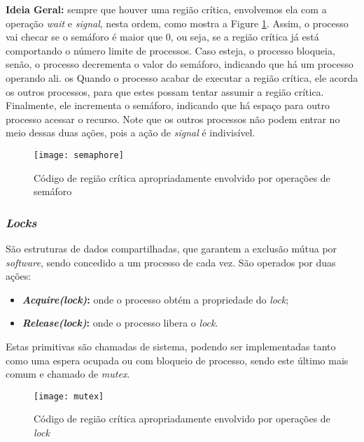 \textbf{Ideia Geral:} sempre que houver uma região crítica, envolvemos ela com a operação \textit{wait} e \textit{signal}, nesta ordem, como mostra a Figure \ref{fig:semaphore}. Assim, o processo vai checar se o semáforo é maior que 0, ou seja, se a região crítica já está comportando o número limite de processos. Caso esteja, o processo bloqueia, senão, o processo decrementa o valor do semáforo, indicando que há um processo operando ali.
os
Quando o processo acabar de executar a região crítica, ele acorda os outros processos, para que estes possam tentar assumir a região crítica. Finalmente, ele incrementa o semáforo, indicando que há espaço para outro processo acessar o recurso. Note que os outros processos não podem entrar no meio dessas duas ações, pois a ação de \textit{signal} é indivisível.


\begin{figure}[ht]
  \centering
  \texttt{[image: semaphore]}
  \caption{Código de região crítica apropriadamente envolvido por operações de semáforo}
  \label{fig:semaphore}
\end{figure}






\subsubsection{\textit{Locks}}
São estruturas de dados compartilhadas, que garantem a exclusão mútua por \textit{software}, sendo concedido a um processo de cada vez. São operados por duas ações:

\begin{itemize}
  \item \textbf{\textit{Acquire(lock)}:} onde o processo obtém a propriedade do \textit{lock};

  \item \textbf{\textit{Release(lock)}:} onde o processo libera o \textit{lock}.
\end{itemize}

Estas primitivas são chamadas de sistema, podendo ser implementadas tanto como uma espera ocupada ou com bloqueio de processo, sendo este último mais comum e chamado de \textit{mutex}.

\begin{figure}[ht]
  \centering
  \texttt{[image: mutex]}
  \caption{Código de região crítica apropriadamente envolvido por operações de \textit{lock}}
  \label{fig:mutex}
\end{figure}


